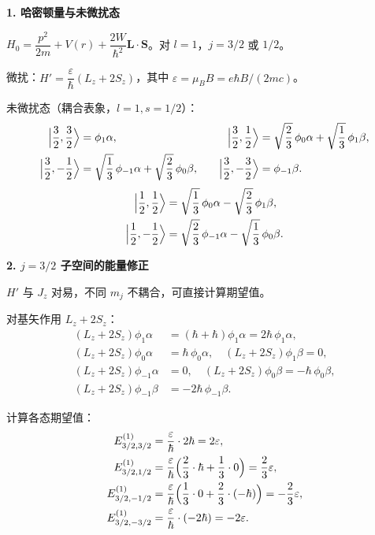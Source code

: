 \begin{derivationbox}[标准解题过程]
\textbf{1. 哈密顿量与未微扰态}

$H_0=\dfrac{p^2}{2m}+V(r)+\dfrac{2W}{\hbar^2}\mathbf{L}\cdot\mathbf{S}$。对 $l=1$，$j=3/2$ 或 $1/2$。

微扰：$H'=\dfrac{\varepsilon}{\hbar}(L_z+2S_z)$，其中 $\varepsilon=\mu_B B=e\hbar B/(2mc)$。

未微扰态（耦合表象，$l=1,s=1/2$）：
\begin{align*}
\Bigl|\frac32,\frac32\Bigr\rangle&=\phi_1\alpha,\quad&\Bigl|\frac32,\frac12\Bigr\rangle&=\sqrt{\frac23}\,\phi_0\alpha+\sqrt{\frac13}\,\phi_1\beta,\\
\Bigl|\frac32,-\frac12\Bigr\rangle&=\sqrt{\frac13}\,\phi_{-1}\alpha+\sqrt{\frac23}\,\phi_0\beta,\quad&\Bigl|\frac32,-\frac32\Bigr\rangle&=\phi_{-1}\beta.
\end{align*}
\begin{align*}
\Bigl|\frac12,\frac12\Bigr\rangle&=\sqrt{\frac13}\,\phi_0\alpha-\sqrt{\frac23}\,\phi_1\beta,\\
\Bigl|\frac12,-\frac12\Bigr\rangle&=\sqrt{\frac23}\,\phi_{-1}\alpha-\sqrt{\frac13}\,\phi_0\beta.
\end{align*}

\textbf{2. $j=3/2$ 子空间的能量修正}

$H'$ 与 $J_z$ 对易，不同 $m_j$ 不耦合，可直接计算期望值。

对基矢作用 $L_z+2S_z$：
\begin{align*}
(L_z+2S_z)\phi_1\alpha&=(\hbar+\hbar)\phi_1\alpha=2\hbar\,\phi_1\alpha,\\
(L_z+2S_z)\phi_0\alpha&=\hbar\,\phi_0\alpha,\quad(L_z+2S_z)\phi_1\beta=0,\\
(L_z+2S_z)\phi_{-1}\alpha&=0,\quad(L_z+2S_z)\phi_0\beta=-\hbar\,\phi_0\beta,\\
(L_z+2S_z)\phi_{-1}\beta&=-2\hbar\,\phi_{-1}\beta.
\end{align*}

计算各态期望值：
\begin{align*}
E_{3/2,3/2}^{(1)}&=\frac{\varepsilon}{\hbar}\cdot2\hbar=2\varepsilon,\\
E_{3/2,1/2}^{(1)}&=\frac{\varepsilon}{\hbar}\Bigl(\frac23\cdot\hbar+\frac13\cdot0\Bigr)=\frac23\varepsilon,\\
E_{3/2,-1/2}^{(1)}&=\frac{\varepsilon}{\hbar}\Bigl(\frac13\cdot0+\frac23\cdot(-\hbar)\Bigr)=-\frac23\varepsilon,\\
E_{3/2,-3/2}^{(1)}&=\frac{\varepsilon}{\hbar}\cdot(-2\hbar)=-2\varepsilon.
\end{align*}


\end{derivationbox}
